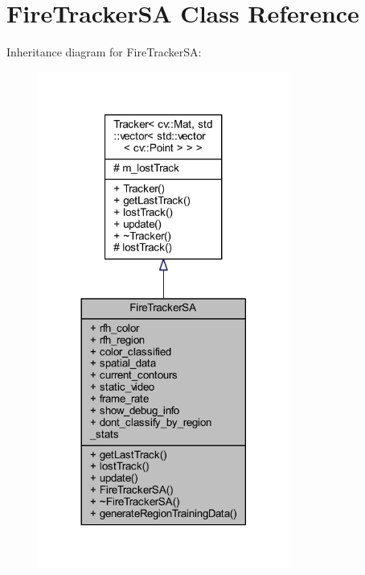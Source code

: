 \hypertarget{class_fire_tracker_s_a}{}\section{Fire\+Tracker\+S\+A Class Reference}
\label{class_fire_tracker_s_a}


Inheritance diagram for Fire\+Tracker\+S\+A\+:
\nopagebreak
\begin{figure}[H]
\begin{center}
\leavevmode
\includegraphics[width=233pt]{class_fire_tracker_s_a__inherit__graph}
\end{center}
\end{figure}


